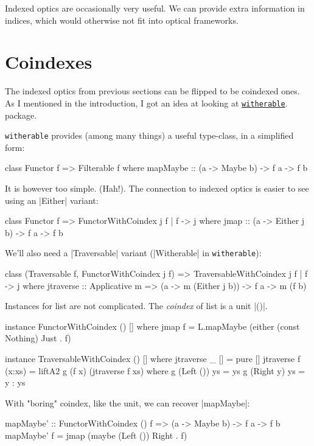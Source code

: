 Indexed optics are occasionally very useful.
We can provide extra information in indices,
which would otherwise not fit into optical frameworks.

\section{Coindexes}

The indexed optics from previous sections can be flipped to be coindexed ones.
As I mentioned in the introduction, I got an idea at looking at
\href{https://hackage.haskell.org/package/witherable}{\texttt{witherable}}.
package.

\texttt{witherable} provides (among many things) a useful type-class,
in a simplified form:

\begin{code}
class Functor f => Filterable f where
    mapMaybe :: (a -> Maybe b) -> f a -> f b
\end{code}

It is however too simple. (Hah!).
The connection to indexed optics is easier to see using
an |Either| variant:

\begin{code}
class Functor f => FunctorWithCoindex j f | f -> j where
    jmap :: (a -> Either j b) -> f a -> f b
\end{code}

We'll also need a |Traversable| variant (|Witherable| in \texttt{witherable}):

\begin{code}
class (Traversable f, FunctorWithCoindex j f)
    => TraversableWithCoindex j f | f -> j
  where
    jtraverse :: Applicative m => (a -> m (Either j b)) -> f a -> m (f b)
\end{code}

Instances for list are not complicated.
The \emph{coindex} of list is a unit |()|.

\begin{code}
instance FunctorWithCoindex () [] where
    jmap f = L.mapMaybe (either (const Nothing) Just . f)

instance TraversableWithCoindex () [] where
    jtraverse _ [] = pure []
    jtraverse f (x:xs) = liftA2 g (f x) (jtraverse f xs) where
        g (Left ()) ys = ys
        g (Right y) ys = y : ys
\end{code}

With "boring" coindex, like the unit, we can recover |mapMaybe|:

\begin{code}
mapMaybe' :: FunctorWithCoindex () f => (a -> Maybe b) -> f a -> f b
mapMaybe' f = jmap (maybe (Left ()) Right . f)
\end{code}

